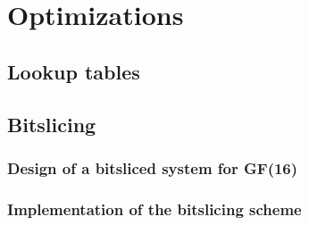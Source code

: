 \section{Optimizations} \label{opti}
\subsection{Lookup tables}
\subsection{Bitslicing}
\subsubsection{Design of a bitsliced system for GF(16)}
\subsubsection{Implementation of the bitslicing scheme}